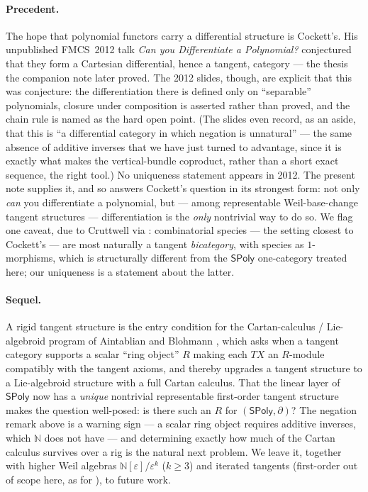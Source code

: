 \documentclass[11pt]{article}
\theoremstyle{definition}
\newcommand{\SPoly}{\mathsf{SPoly}}
\newcommand{\N}{\mathbb{N}}
\begin{document}
\paragraph{Precedent.}
The hope that polynomial functors carry a differential structure is Cockett's. His unpublished
FMCS~2012 talk \emph{Can you Differentiate a Polynomial?} \cite{Cockett2012} conjectured that they
form a Cartesian differential, hence a tangent, category --- the thesis the companion note
\cite{MacBethTangent} later proved. The 2012 slides, though, are explicit that this was conjecture:
the differentiation there is defined only on ``separable'' polynomials, closure under composition is
asserted rather than proved, and the chain rule is named as the hard open point. (The slides even
record, as an aside, that this is ``a differential category in which negation is unnatural'' --- the
same absence of additive inverses that we have just turned to advantage, since it is exactly what
makes the vertical-bundle coproduct, rather than a short exact sequence, the right tool.) No
uniqueness statement appears in 2012. The present note supplies it, and so answers Cockett's
question in its strongest form: not only \emph{can} you differentiate a polynomial, but --- among
representable Weil-base-change tangent structures --- differentiation is the \emph{only} nontrivial
way to do so. We flag one caveat, due to Cruttwell via
\cite{MO341933}: combinatorial species --- the setting closest to Cockett's --- are most naturally a
tangent \emph{bicategory}, with species as $1$-morphisms, which is structurally different from the
$\SPoly$ one-category treated here; our uniqueness is a statement about the latter.

\paragraph{Sequel.}
A rigid tangent structure is the entry condition for the Cartan-calculus / Lie-algebroid program of
Aintablian and Blohmann \cite{AintablianBlohmann2026}, which asks when a tangent category supports a
scalar ``ring object'' $R$ making each $TX$ an $R$-module compatibly with the tangent axioms, and
thereby upgrades a tangent structure to a Lie-algebroid structure with a full Cartan calculus. That
the linear layer of $\SPoly$ now has a \emph{unique} nontrivial representable first-order tangent
structure makes the question well-posed: is there such an $R$ for $(\SPoly,\partial)$? The negation remark above is a warning
sign --- a scalar ring object requires additive inverses, which $\N$ does not have --- and
determining exactly how much of the Cartan calculus survives over a rig is the natural next problem.
We leave it, together with higher Weil algebras $\N[\varepsilon]/\varepsilon^k$ ($k\ge3$) and
iterated tangents (first-order out of scope here, as for \cite{AAGM2003,LanfranchiLemay2025,CCGZ2024}),
to future work.
\end{document}
